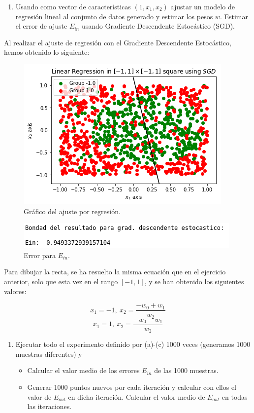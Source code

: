 \documentclass[11pt,a4paper]{article}
\begin{document}
\begin{itemize}
	\begin{enumerate}[resume, label=\alph*)]
		\item Usando como vector de características $(1, x_1, x_2)$ ajustar un modelo de regresión lineal al conjunto de
		datos generado y estimar los pesos $w$. Estimar el error de ajuste $E_{in}$ usando Gradiente Descendente Estocástico
		(SGD).
	\end{enumerate}
	
	Al realizar el ajuste de regresión con el Gradiente Descendente Estocástico, hemos obtenido lo siguiente:
	
	\begin{figure}[H]
	\centering
	\includegraphics[scale=0.6]{img/random_regression.png}
	\caption{Gráfico del ajuste por regresión.}
	\end{figure}
	
	\begin{figure}[H]
	\centering
	\includegraphics[scale=0.6]{img/random_error.png}
	\caption{Error para $E_{in}$.}
	\end{figure}
	
	Para dibujar la recta, se ha resuelto la misma ecuación que en el ejercicio anterior, solo que esta vez en el rango
	$[-1, 1]$, y se han obtenido los siguientes valores:
	
	\[x_1 = -1, \: x_2 = \frac{-w_0 + w_1}{w_2}\]
	\[x_1 = 1, \: x_2 = \frac{-w_0 - w_1}{w_2}\]
	
	\begin{enumerate}[resume, label=\alph*)]
		\item Ejecutar todo el experimento definido por (a)-(c) 1000 veces (generamos 1000 muestras diferentes) y
		\begin{itemize}
			\item Calcular el valor medio de los errores $E_{in}$ de las 1000 muestras.
			\item Generar 1000 puntos nuevos por cada iteración y calcular con ellos el valor de $E_{out}$ en dicha iteración.
			Calcular el valor medio de $E_{out}$ en todas las iteraciones.
		\end{itemize}
	\end{enumerate}
	

\end{itemize}
\end{document}
